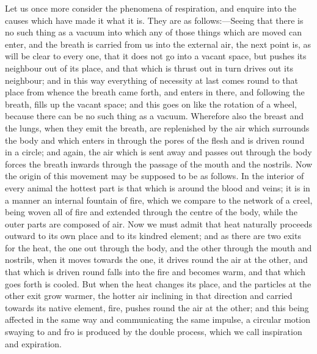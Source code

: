 \documentclass[11pt,letter]{article}
\begin{document}
\par  Let us once more consider the phenomena of respiration, and enquire into the causes which have made it what it is. They are as follows:—Seeing that there is no such thing as a vacuum into which any of those things which are moved can enter, and the breath is carried from us into the external air, the next point is, as will be clear to every one, that it does not go into a vacant space, but pushes its neighbour out of its place, and that which is thrust out in turn drives out its neighbour; and in this way everything of necessity at last comes round to that place from whence the breath came forth, and enters in there, and following the breath, fills up the vacant space; and this goes on like the rotation of a wheel, because there can be no such thing as a vacuum. Wherefore also the breast and the lungs, when they emit the breath, are replenished by the air which surrounds the body and which enters in through the pores of the flesh and is driven round in a circle; and again, the air which is sent away and passes out through the body forces the breath inwards through the passage of the mouth and the nostrils. Now the origin of this movement may be supposed to be as follows. In the interior of every animal the hottest part is that which is around the blood and veins; it is in a manner an internal fountain of fire, which we compare to the network of a creel, being woven all of fire and extended through the centre of the body, while the outer parts are composed of air. Now we must admit that heat naturally proceeds outward to its own place and to its kindred element; and as there are two exits for the heat, the one out through the body, and the other through the mouth and nostrils, when it moves towards the one, it drives round the air at the other, and that which is driven round falls into the fire and becomes warm, and that which goes forth is cooled. But when the heat changes its place, and the particles at the other exit grow warmer, the hotter air inclining in that direction and carried towards its native element, fire, pushes round the air at the other; and this being affected in the same way and communicating the same impulse, a circular motion swaying to and fro is produced by the double process, which we call inspiration and expiration.
\end{document}
